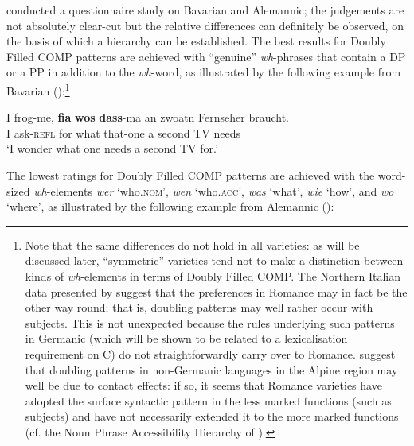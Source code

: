 \citet[88--89]{bayerbrandner2008} conducted a questionnaire study on Bavarian and Alemannic; the judgements are not absolutely clear-cut but the relative differences can definitely be observed, on the basis of which a hierarchy can be established. The best results for Doubly Filled COMP patterns are achieved with ``genuine'' \textit{wh}-phrases that contain a DP or a PP in addition to the \textit{wh}-word, as illustrated by the following example from Bavarian (\citealt[88, ex. 3a]{bayerbrandner2008}):\footnote{Note that the same differences do not hold in all varieties: as will be discussed later, ``symmetric'' varieties tend not to make a distinction between kinds of \textit{wh}-elements in terms of Doubly Filled COMP. The Northern Italian data presented by \citet{polettovanelli1997} suggest that the preferences in Romance may in fact be the other way round; that is, doubling patterns may well rather occur with subjects. This is not unexpected because the rules underlying such patterns in Germanic (which will be shown to be related to a lexicalisation requirement on C) do not straightforwardly carry over to Romance. \citet{schallertbidese2021} suggest that doubling patterns in non-Germanic languages in the Alpine region may well be due to contact effects: if so, it seems that Romance varieties have adopted the surface syntactic pattern in the less marked functions (such as subjects) and have not necessarily extended it to the more marked functions (cf. the Noun Phrase Accessibility Hierarchy of \citealt{keenancomrie1977}).}

\ea \gll I frog-me, \textbf{fia} \textbf{wos} \textbf{dass}-ma an zwoatn Fernseher braucht. \label{wosdass}\\
I ask-\textsc{refl} for what that-one a second TV needs\\
\glt `I wonder what one needs a second TV for.'
\z

The lowest ratings for Doubly Filled COMP patterns are achieved with the word-sized \textit{wh}-elements \textit{wer} `who.\textsc{nom}', \textit{wen} `who.\textsc{acc}', \textit{was} `what', \textit{wie} `how', and \textit{wo} `where', as illustrated by the following example from Alemannic (\citealt[88, ex. 5b]{bayerbrandner2008}):

\z

